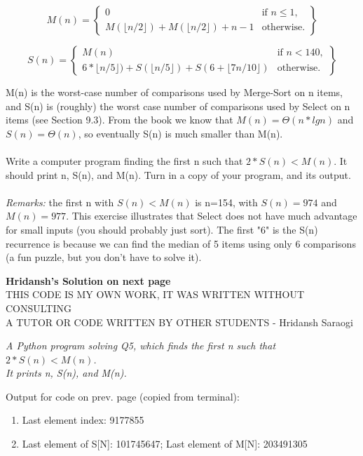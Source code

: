 \documentclass[11pt]{article}
\begin{document}
\begin{enumerate}
        \begin{equation}
        M(n) = 
        \left\{
            \begin{array}{lr}
                0 & \text{if }  n \leq 1,\\
                M(\lfloor n/2 \rfloor) + M( \lfloor n/2 \rfloor)+n-1 & \text{otherwise}.
            \end{array}
        \right\}
        \end{equation}     
        
        \begin{equation}
        S(n) = 
        \left\{
            \begin{array}{lr}
                M(n) & \text{if }  n < 140,\\
                6*\lfloor n/5 \rfloor) + S( \lfloor n/5 \rfloor)+ S(6 + \lfloor 7n/10 \rfloor) & \text{otherwise}.
            \end{array}
        \right\}
        \end{equation}  
        
        M(n) is the worst-case number of comparisons used by Merge-Sort on n items, and S(n) is (roughly) the worst case number of comparisons used by Select on n items (see Section 9.3). From the book we know that $M(n)=Θ(n*lg n)$ and $S(n)=Θ(n)$, so eventually S(n) is much smaller than M(n).\\ \\
        Write a computer program finding the first n such that $2*S(n) < M(n)$. It should print n, S(n), and M(n). Turn in a copy of your program, and its output.
        \\ \\
        \textit{Remarks: }the first n with $S(n)<M(n)$ is n=154, with $S(n)=974$ and $M(n)=977$. This exercise illustrates that Select does not have much advantage for small inputs (you should probably just sort). The first "6" is the S(n) recurrence is because we can find the median of 5 items using only 6 comparisons (a fun puzzle, but you don't have to solve it). \vspace{2cm}
        
        
        \textbf{Hridansh's Solution on next page}\\
        THIS CODE IS MY OWN WORK, IT WAS WRITTEN WITHOUT CONSULTING \\A TUTOR OR CODE WRITTEN BY OTHER STUDENTS - Hridansh Saraogi


\end{enumerate}
\pagebreak
\textit{A Python program solving Q5, which finds the first n such that $2*S(n) < M(n)$. \\It prints n, S(n), and M(n).}


\pagebreak
\begin{flushleft}
    Output for code on prev. page (copied from terminal):
\end{flushleft}
\begin{enumerate}
    \item Last element index: 9177855
    \item Last element of S[N]: 101745647; Last element of M[N]: 203491305
\end{enumerate}
\end{document}
